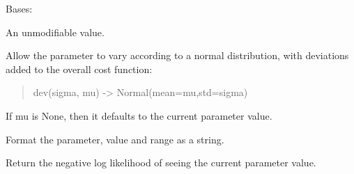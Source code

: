 \documentclass[letterpaper,10pt,english]{sphinxmanual}
\begin{document}

\begin{fulllineitems}
\label{api/mystic.parameter:refl1d.mystic.parameter.Constant}
Bases: {\hyperref[api/mystic.parameter:refl1d.mystic.parameter.BaseParameter]{}}

An unmodifiable value.

\begin{fulllineitems}
\label{api/mystic.parameter:refl1d.mystic.parameter.Constant.dev}
Allow the parameter to vary according to a normal distribution, with
deviations added to the overall cost function:
\begin{quote}

dev(sigma, mu) -\textgreater{} Normal(mean=mu,std=sigma)
\end{quote}

If mu is None, then it defaults to the current parameter value.

\end{fulllineitems}


\begin{fulllineitems}
\label{api/mystic.parameter:refl1d.mystic.parameter.Constant.format}
Format the parameter, value and range as a string.

\end{fulllineitems}


\begin{fulllineitems}
\label{api/mystic.parameter:refl1d.mystic.parameter.Constant.nllf}
Return the negative log likelihood of seeing the current parameter value.

\end{fulllineitems}


\begin{fulllineitems}
\label{api/mystic.parameter:refl1d.mystic.parameter.Constant.parameters}
\end{fulllineitems}


\end{fulllineitems}
\end{document}
